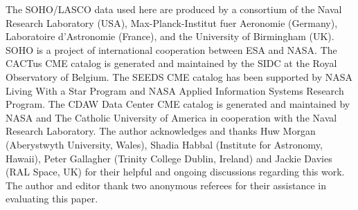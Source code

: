 \documentclass[referee,a4paper,12pt,traditabstract]{swsc}
\begin{document}
\begin{acknowledgements}
     
The SOHO/LASCO data used here are produced by a consortium of the Naval Research Laboratory (USA), Max-Planck-Institut fuer Aeronomie (Germany), Laboratoire d'Astronomie (France), and the University of Birmingham (UK). SOHO is a project of international cooperation between ESA and NASA.
The CACTus CME catalog is generated and maintained by the SIDC at the Royal Observatory of Belgium.
The SEEDS CME catalog has been supported by NASA Living With a Star Program and NASA Applied Information Systems Research Program.
The CDAW Data Center CME catalog is generated and maintained by NASA and The Catholic University of America in cooperation with the Naval Research Laboratory.
The author acknowledges and thanks Huw Morgan (Aberystwyth University, Wales), Shadia Habbal (Institute for Astronomy, Hawaii), Peter Gallagher (Trinity College Dublin, Ireland) and Jackie Davies (RAL Space, UK) for their helpful and ongoing discussions regarding this work.
The author and editor thank two anonymous referees for their assistance in evaluating this paper.      
     
\end{acknowledgements}


%

  

\end{document}
